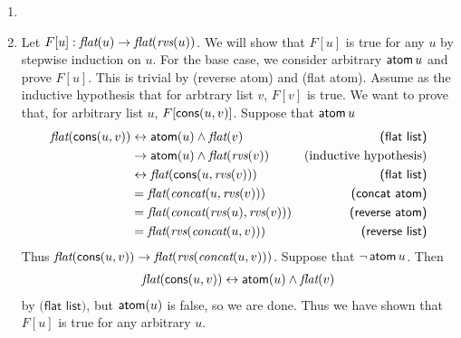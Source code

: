 \begin{exer}[4.1]
    $ $
    \begin{enumerate}[label=(\alph*)]
        \item
        \item
            Let $F[u]: \operatorname{\textit{flat}}(u) \rightarrow \operatorname{\textit{flat}}(\operatorname{\textit{rvs}}(u))$.
            We will show that $F[u]$ is true for any $u$ by stepwise induction on $u$.
            For the base case, we consider arbitrary $\operatorname{\textsf{atom}} u$ and prove $F[u]$.
            This is trivial by \textsf{(reverse atom)} and \textsf{(flat atom)}.
            Assume as the inductive hypothesis that for arbtrary list $v$, $F[v]$ is true.
            We want to prove that, for arbitrary list $u$, $F[\operatorname{\textsf{cons}}(u, v)]$.
            Suppose that $\operatorname{\textsf{atom}} u$
            \begin{align*}
                \operatorname{\textit{flat}}(\operatorname{\textsf{cons}}(u, v))
                    &\leftrightarrow \operatorname{\textsf{atom}}(u) \land \operatorname{\textit{flat}}(v) & \textsf{(flat list)}\\
                    &\rightarrow \operatorname{\textsf{atom}}(u) \land \operatorname{\textit{flat}}(\operatorname{\textit{rvs}}(v)) & \text{(inductive hypothesis)}\\
                    &\leftrightarrow \operatorname{\textit{flat}}(\operatorname{\textsf{cons}}(u, \operatorname{\textit{rvs}}(v))) & \textsf{(flat list)} \\
                    &= \operatorname{\textit{flat}}(\operatorname{\textit{concat}}(u, \operatorname{\textit{rvs}}(v))) & \textsf{(concat atom)} \\
                    &= \operatorname{\textit{flat}}(\operatorname{\textit{concat}}(\operatorname{\textit{rvs}}(u), \operatorname{\textit{rvs}}(v))) & \textsf{(reverse atom)} \\
                    &= \operatorname{\textit{flat}}(\operatorname{\textit{rvs}}(\operatorname{\textit{concat}}(u, v))) & \textsf{(reverse list)} \\
            \end{align*}
            Thus $\operatorname{\textit{flat}}(\operatorname{\textsf{cons}}(u, v)) \rightarrow \operatorname{\textit{flat}}(\operatorname{\textit{rvs}}(\operatorname{\textit{concat}}(u, v)))$.
            Suppose that $\neg\operatorname{\textsf{atom}} u$.
            Then
            \begin{align*}
                \operatorname{\textit{flat}}(\operatorname{\textsf{cons}}(u, v)) \leftrightarrow \operatorname{\textsf{atom}}(u) \land \operatorname{\textit{flat}}(v)
            \end{align*}
            by $\textsf{(flat list)}$, but $\operatorname{\textsf{atom}}(u)$ is false, so we are done.
            Thus we have shown that $F[u]$ is true for any arbitrary $u$.
    \end{enumerate}
\end{exer}
